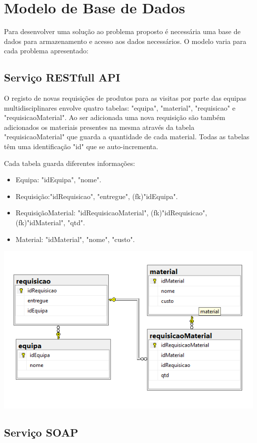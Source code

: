 \chapter{Modelo de Base de Dados}

Para desenvolver uma solução ao problema proposto é necessária uma base de dados para armazenamento e acesso aos dados necessários. O modelo varia para cada problema apresentado:

\section{Serviço RESTfull API}
O registo de novas requisições de produtos para as visitas por parte das equipas multidisciplinares envolve quatro tabelas: "equipa", "material", "requisicao" e "requisicaoMaterial". Ao ser adicionada uma nova requisição são também adicionados os materiais presentes na mesma através da tabela "requisicaoMaterial" que guarda a quantidade de cada material. Todas as tabelas têm uma identificação "id" que se auto-incrementa.

Cada tabela guarda diferentes informações:
\begin{itemize}
    \item Equipa: "idEquipa", "nome".
    \item Requisição:"idRequisicao", "entregue", (fk)"idEquipa".
    \item RequisiçãoMaterial: "idRequisicaoMaterial", (fk)"idRequisicao", (fk)"idMaterial", "qtd".
    \item Material: "idMaterial", "nome", "custo".
\end{itemize}
\includegraphics[scale=0.75]{imagens/basedadosRest.png}


\section{Serviço SOAP}


